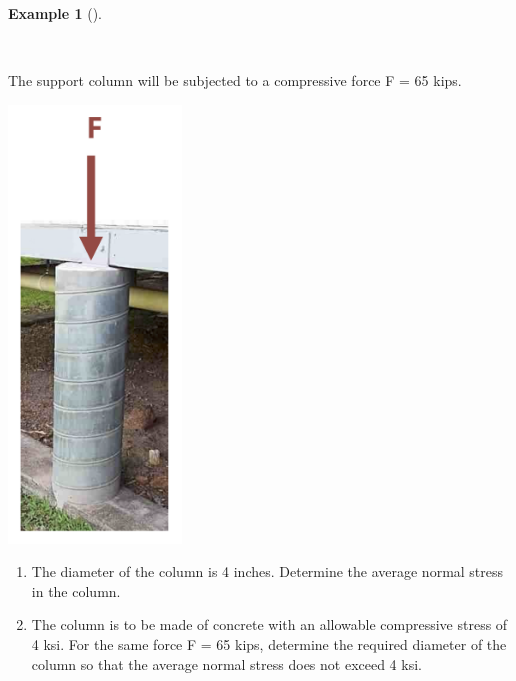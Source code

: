\documentclass[
  letterpaper,
  DIV=11,
  numbers=noendperiod]{scrreprt}
\theoremstyle{definition}
\newtheorem{example}{Example}[chapter]
\theoremstyle{remark}
\begin{document}
\begin{tcolorbox}[enhanced jigsaw, leftrule=.75mm, bottomrule=.15mm, opacityback=0, opacitybacktitle=0.6, colframe=quarto-callout-tip-color-frame, toprule=.15mm, colbacktitle=quarto-callout-tip-color!10!white, coltitle=black, bottomtitle=1mm, title={Example 2.1}, titlerule=0mm, toptitle=1mm, colback=white, rightrule=.15mm, left=2mm, arc=.35mm, breakable]

\begin{example}[]\protect\hypertarget{exm-2.1}{}\label{exm-2.1}

~

The support column will be subjected to a compressive force F = 65 kips.

\begin{center}
\includegraphics[width=1.8125in,height=\textheight]{images/Updated CH2 examples/example 2.1 part 1.png}
\end{center}

\begin{enumerate}
\def\labelenumi{\arabic{enumi}.}
\item
  The diameter of the column is 4 inches. Determine the average normal
  stress in the column.
\item
  The column is to be made of concrete with an allowable compressive
  stress of 4 ksi. For the same force F = 65 kips, determine the
  required diameter of the column so that the average normal stress does
  not exceed 4 ksi.
\end{enumerate}


\end{example}
\end{tcolorbox}
\end{document}
